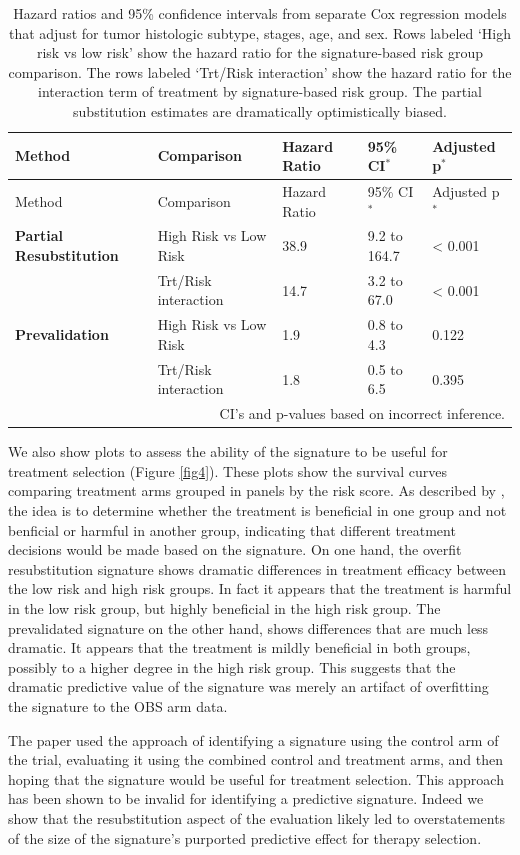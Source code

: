 \documentclass[11pt,]{article}
\begin{document}
\begin{longtable}[c]{@{}lllll@{}}
\caption{Hazard ratios and 95\% confidence intervals from separate Cox
regression models that adjust for tumor histologic subtype, stages, age,
and sex. Rows labeled `High risk vs low risk' show the hazard ratio for
the signature-based risk group comparison. The rows labeled `Trt/Risk
interaction' show the hazard ratio for the interaction term of treatment
by signature-based risk group. The partial substitution estimates are
dramatically optimistically biased. \label{adjhr}}\tabularnewline
\toprule
Method & Comparison & Hazard Ratio & 95\% CI$^*$ & Adjusted
p$^*$\tabularnewline
\midrule
\endfirsthead
\toprule
Method & Comparison & Hazard Ratio & 95\% CI$^*$ & Adjusted
p$^*$\tabularnewline
\midrule
\endhead
\textbf{Partial Resubstitution} & High Risk vs Low Risk & 38.9 & 9.2 to
164.7 & \textless{} 0.001\tabularnewline
& Trt/Risk interaction & 14.7 & 3.2 to 67.0 & \textless{}
0.001\tabularnewline
\textbf{Prevalidation} & High Risk vs Low Risk & 1.9 & 0.8 to 4.3 &
0.122\tabularnewline
& Trt/Risk interaction & 1.8 & 0.5 to 6.5 & 0.395\tabularnewline
\bottomrule
& \multicolumn{4}{r}{CI's and p-values based on incorrect inference.} \\
\end{longtable}

We also show plots to assess the ability of the signature to be useful
for treatment selection (Figure \ref{fig4}). These plots show the
survival curves comparing treatment arms grouped in panels by the risk
score. As described by \citet{polley2013statistical}, the idea is to
determine whether the treatment is beneficial in one group and not
benficial or harmful in another group, indicating that different
treatment decisions would be made based on the signature. On one hand,
the overfit resubstitution signature shows dramatic differences in
treatment efficacy between the low risk and high risk groups. In fact it
appears that the treatment is harmful in the low risk group, but highly
beneficial in the high risk group. The prevalidated signature on the
other hand, shows differences that are much less dramatic. It appears
that the treatment is mildly beneficial in both groups, possibly to a
higher degree in the high risk group. This suggests that the dramatic
predictive value of the signature was merely an artifact of overfitting
the signature to the OBS arm data.

The \citet{zhu2010prognostic} paper used the approach of identifying a
signature using the control arm of the trial, evaluating it using the
combined control and treatment arms, and then hoping that the signature
would be useful for treatment selection. This approach has been shown to
be invalid \citep{simon2011re} for identifying a predictive signature.
Indeed we show that the resubstitution aspect of the evaluation likely
led to overstatements of the size of the signature's purported
predictive effect for therapy selection.
\end{document}
